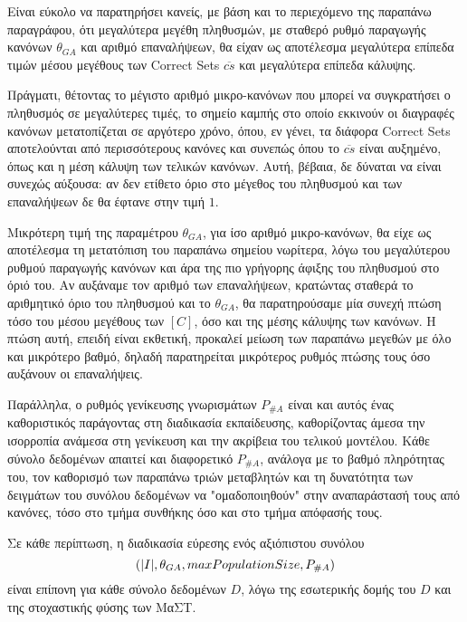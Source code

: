 Είναι εύκολο να παρατηρήσει κανείς, με βάση και το περιεχόμενο της παραπάνω παραγράφου, ότι μεγαλύτερα μεγέθη πληθυσμών, με σταθερό ρυθμό παραγωγής κανόνων $\theta_{GA}$ και αριθμό επαναλήψεων, θα είχαν ως αποτέλεσμα μεγαλύτερα επίπεδα τιμών μέσου μεγέθους των Correct Sets $\overline{cs}$ και μεγαλύτερα επίπεδα κάλυψης.

Πράγματι, θέτοντας το μέγιστο αριθμό μικρο-κανόνων που μπορεί να συγκρατήσει ο πληθυσμός σε μεγαλύτερες τιμές, το σημείο καμπής στο οποίο εκκινούν οι διαγραφές κανόνων μετατοπίζεται σε αργότερο χρόνο, όπου, εν γένει, τα διάφορα Correct Sets αποτελούνται από περισσότερους κανόνες και συνεπώς όπου το $\overline{cs}$ είναι αυξημένο, όπως και η μέση κάλυψη των τελικών κανόνων. Αυτή, βέβαια, δε δύναται να είναι συνεχώς αύξουσα: αν δεν ετίθετο όριο στο μέγεθος του πληθυσμού και των επαναλήψεων δε θα έφτανε στην τιμή $1$. 

Μικρότερη τιμή της παραμέτρου $\theta_{GA}$, για ίσο αριθμό μικρο-κανόνων, θα είχε ως αποτέλεσμα τη μετατόπιση του παραπάνω σημείου νωρίτερα, λόγω του μεγαλύτερου ρυθμού παραγωγής κανόνων και άρα της πιο γρήγορης άφιξης του πληθυσμού στο όριό του. Αν αυξάναμε τον αριθμό των επαναλήψεων, κρατώντας σταθερά το αριθμητικό όριο του πληθυσμού και το $\theta_{GA}$, θα παρατηρούσαμε μία συνεχή πτώση τόσο του μέσου μεγέθους των $[C]$, όσο και της μέσης κάλυψης των κανόνων. Η πτώση αυτή, επειδή είναι εκθετική, προκαλεί μείωση των παραπάνω μεγεθών με όλο και μικρότερο βαθμό, δηλαδή παρατηρείται μικρότερος ρυθμός πτώσης τους όσο αυξάνουν οι επαναλήψεις. 

Παράλληλα, ο ρυθμός γενίκευσης γνωρισμάτων $P_{\#A}$ είναι και αυτός ένας καθοριστικός παράγοντας στη διαδικασία εκπαίδευσης, καθορίζοντας άμεσα την ισορροπία ανάμεσα στη γενίκευση και την ακρίβεια του τελικού μοντέλου. Κάθε σύνολο δεδομένων απαιτεί και διαφορετικό $P_{\#A}$, ανάλογα με το βαθμό πληρότητας του, τον καθορισμό των παραπάνω τριών μεταβλητών και τη δυνατότητα των δειγμάτων του συνόλου δεδομένων να "ομαδοποιηθούν" στην αναπαράστασή τους από κανόνες, τόσο στο τμήμα συνθήκης όσο και στο τμήμα απόφασής τους.

Σε κάθε περίπτωση, η διαδικασία εύρεσης ενός αξιόπιστου συνόλου $$(\lvert I\rvert, \theta_{GA}, maxPopulationSize, P_{\#A})$$ είναι επίπονη για κάθε σύνολο δεδομένων $D$, λόγω της εσωτερικής δομής του $D$ και της στοχαστικής φύσης των ΜαΣΤ. 

